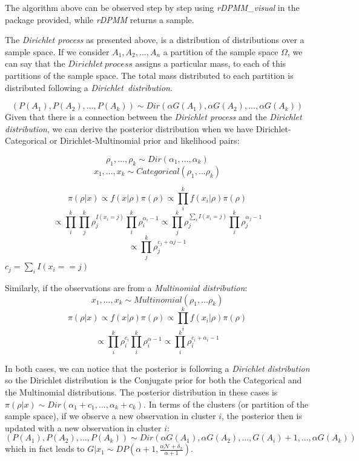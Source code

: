 \documentclass[12pt,a4paper]{article}
\begin{document}
The algorithm above can be observed step by step using \textit{rDPMM\_visual} in the package provided, while \textit{rDPMM} returns a sample.

The \textit{Dirichlet process} as presented above, is a distribution of distributions over a sample space. If we consider $A_{1}, A_{2}, ..., A_{n}$ a partition of the sample space $\Omega$, we can say that the $Dirichlet\ process$ assigns a particular mass, to each of this partitions of the sample space. The total mass distributed to each partition is distributed following a \textit{Dirichlet\ distribution}. 

$$(P(A_{1}), P(A_{2}), ... , P(A_{k})) \sim Dir(\alpha G(A_{1}), \alpha G(A_{2}), ..., \alpha G(A_{k}))$$
Given that there is a connection between the \textit{Dirichlet process} and the \textit{Dirichlet distribution}, we can derive the posterior distribution when we have Dirichlet-Categorical or Dirichlet-Multinomial prior and likelihood pairs:

$$\rho_{1}, ... ,\rho_{k} \sim Dir(\alpha_{1}, ..., \alpha_{k})$$
$$x_{1}, ... ,x_{k} \sim Categorical(\rho_{1}, ... \rho_{k})$$

$$\displaystyle \pi(\rho|x) \propto f(x|\rho)\pi(\rho) \propto \prod_{i}^{k} f(x_{i}| \rho)\pi(\rho) $$
$$\propto \prod_{i}^k \prod_{j}^k \rho_{j}^{I(x_{i} = j)}\prod_{i}^k \rho_{i}^{\alpha_{i} - 1} \propto \prod_{j}^k \rho_{j}^{\sum_{i}I(x_{i} = j)}\prod_{i}^k \rho_{j}^{\alpha_{j} - 1}$$
$$ \propto \prod_{j}^k \rho_j^{{c_{j}} + \alpha{j} - 1}$$
$c_{j} = \sum_i I(x_{i} == j) $

Similarly, if the observations are from a \textit{Multinomial distribution}:
$$x_{1}, ... ,x_{k} \sim Multinomial(\rho_{1}, ... \rho_{k})$$
$$\displaystyle \pi(\rho|x) \propto f(x|\rho)\pi(\rho) \propto \prod_{i}^{k} f(x_{i}| \rho)\pi(\rho) $$
$$ \propto \prod_{i}^{k} \rho_{i}^{c_{i}} \prod_{i}^{k} \rho_{i}^{\alpha - 1} \propto \prod_{i}^{k} \rho_{i}^{c_{i} + \alpha_{i} - 1}$$ 

In both cases, we can notice that the posterior is following a \textit{Dirichlet distribution} so the Dirichlet distribution is the Conjugate prior for both the Categorical and the Multinomial distributions. The posterior distribution in these cases is $\pi(\rho|x) \sim Dir(\alpha_{1} + c_{1}, ..., \alpha_{k} + c_{k})$. In terms of the clusters (or partition of the sample space), if we observe a new observation in cluster $i$, the posterior then is updated with a new observation in cluster $i$:
$$(P(A_{1}), P(A_{2}), ... , P(A_{k})) \sim Dir(\alpha G(A_{1}), \alpha G(A_{2}), ..., G(A_{i}) + 1, ..., \alpha G(A_{k}))$$ which in fact leads to $ G|x_{1} \sim DP(\alpha + 1, \frac{\alpha \mathcal{N} + \delta_{x}}{\alpha + 1})$.
\end{document}
